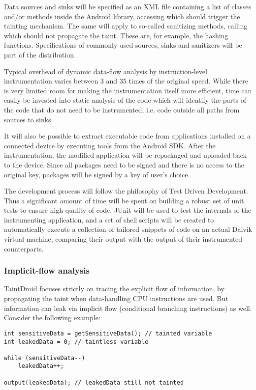 \documentclass[12pt]{article}
\begin{document}
Data sources and sinks will be specified as an XML file containing a list
of classes and/or methods inside the Android library, accessing which
should trigger the tainting mechanism. The same will apply to so-called 
sanitizing methods, calling which should not propagate the taint. These
are, for example, the hashing functions. Specifications of commonly used 
sources, sinks and sanitizers will be part of the distribution.

Typical overhead of dynamic data-flow analysis by instruction-level 
instrumentation varies between 3 and 35 times of the original speed. While 
there is very limited room for making the instrumentation itself more 
efficient, time can easily be invested into static analysis of the code which 
will identify the parts of the code that do not need to be instrumented, 
i.e. code outside all paths from sources to sinks. 

It will also be possible to extract executable code from applications 
installed on a connected device by executing tools from the Android SDK.
After the instrumentation, the modified application will be repackaged and
uploaded back to the device. Since all packages need to be signed and there
is no access to the original key, packages will be signed by a key of user's
choice.

The development process will follow the philosophy of Test Driven 
Development. Thus a significant amount of time will be spent on building 
a robust set of unit tests to ensure high quality of code. JUnit will be 
used to test the internals of the instrumenting application, and a set of 
shell scripts will be created to automatically execute a collection
of tailored snippets of code on an actual Dalvik virtual machine, 
comparing their output with the output of their instrumented counterparts.

\subsubsection*{Implicit-flow analysis}

TaintDroid focuses strictly on tracing the explicit flow of information, 
by propagating the taint when data-handling CPU instructions are used. 
But information can leak via implicit flow (conditional branching 
instructions) as well. Consider the following example:

\begin{verbatim}
int sensitiveData = getSensitiveData(); // tainted variable
int leakedData = 0; // taintless variable

while (sensitiveData--)
    leakedData++;

output(leakedData); // leakedData still not tainted
\end{verbatim}
\end{document}
